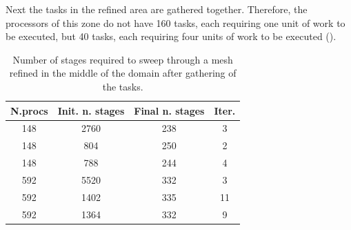 \documentclass[letterpaper]{article}
\renewcommand{\(}{\left(}
\renewcommand{\)}{\right)}
\renewcommand{\[}{\left[}
\renewcommand{\]}{\right]}
\begin{document}
Next the tasks in the refined area are gathered together.
Therefore, the processors of this zone do not have 160 tasks, each requiring one
unit of work to be executed, but 40 tasks, each requiring four units of work to
be executed (). 
\begin{table}[H]
  \begin{center}
    \begin{tabular}{|c|c|c|c|}
      \hline
      N.procs & Init. n. stages & Final n. stages & Iter. \\
      \hline
      148 & 2760 & 238 & 3  \\
      148 & 804  & 250 & 2  \\
      148 & 788  & 244 & 4  \\
      592 & 5520 & 332 & 3  \\
      592 & 1402 & 335 & 11 \\
      592 & 1364 & 332 & 9  \\
      \hline
    \end{tabular}
    \caption{Number of stages required to sweep through a mesh refined in the
      middle of the domain after gathering of the tasks.}
    \label{amr_2}
  \end{center}
\end{table}
\end{document}
